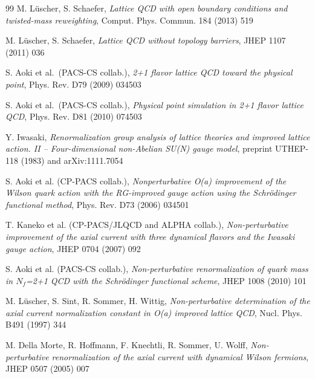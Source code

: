 \begin{thebibliography}{99}
M. L\"uscher, S. Schaefer,
{\it  	
Lattice QCD with open boundary conditions and twisted-mass reweighting},
Comput. Phys. Commun. 184 (2013) 519



M. L\"uscher, S. Schaefer,
{\it Lattice QCD without topology barriers},
JHEP 1107 (2011) 036



S. Aoki et al.~(PACS-CS collab.), 
{\it 2+1 flavor lattice QCD toward the physical point},
Phys. Rev. D79 (2009) 034503

S. Aoki et al.~(PACS-CS collab.),
{\it Physical point simulation in 2+1 flavor lattice QCD},
Phys. Rev. D81 (2010) 074503



Y. Iwasaki,
{\it Renormalization group analysis of lattice theories and
improved lattice action. II -- Four-dimensional non-Abelian SU(N) gauge model},
preprint UTHEP-118 (1983) and arXiv:1111.7054



S. Aoki et al. (CP-PACS collab.),
{\it Nonperturbative O(a) improvement of the Wilson quark action with the 
RG-improved gauge action using the Schr\"odinger functional method},
Phys. Rev. D73 (2006) 034501

T. Kaneko et al. (CP-PACS/JLQCD and ALPHA collab.),
{\it Non-perturbative improvement of the axial current with 
three dynamical flavors and the Iwasaki gauge action},
JHEP 0704 (2007) 092



S. Aoki et al. (PACS-CS collab.),
{\it Non-perturbative renormalization of quark mass 
in $N_f$=2+1 QCD with the Schr\"odinger functional scheme},
JHEP 1008 (2010) 101



M. L\"uscher, S. Sint, R. Sommer, H. Wittig,
{\it Non-perturbative determination of the axial current 
normalization constant in O(a) improved lattice QCD},
Nucl. Phys. B491 (1997) 344

M. Della Morte, R. Hoffmann, F. Knechtli, R. Sommer, U. Wolff,
{\it Non-pertur\-ba\-tive renormalization of the axial current 
with dynamical Wilson fermions},
JHEP 0507 (2005) 007





\end{thebibliography}
